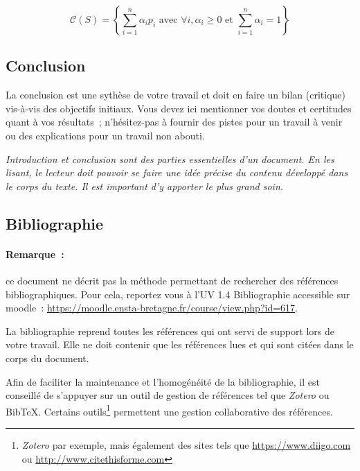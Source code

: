 \begin{equation}
  \label{eq:1}
  \mathcal C(S)=
  \left\{
    \sum_{i=1}^n\alpha_i p_i \mbox{ avec } \forall i, \alpha_i\geqslant 0
    \mbox{ et } \sum_{i=1}^n\alpha_i =  1
  \right\}
\end{equation}

\subsection{Conclusion}

La conclusion est une sythèse de votre travail et doit en faire un bilan
(critique) vis-à-vis des 
objectifs initiaux. 
Vous devez ici mentionner vos doutes et certitudes quant à
vos résultats~; n'hésitez-pas à fournir des pistes pour un travail à venir ou
des explications pour un travail non abouti.


\emph{Introduction et conclusion sont des parties essentielles d'un
  document. En les lisant, le lecteur doit pouvoir se faire une idée
  précise du contenu développé dans le corps du texte. Il est
  important d'y apporter le plus grand soin.}

\subsection{Bibliographie}

\paragraph{Remarque~:} ce document ne décrit pas la méthode
permettant de rechercher des références bibliographiques. Pour cela,
reportez vous à l'UV 1.4 \og{}Bibliographie\fg{} accessible sur moodle~:
\url{https://moodle.ensta-bretagne.fr/course/view.php?id=617}.

La bibliographie reprend toutes les références qui ont servi de support lors de
votre travail. Elle ne doit contenir que les références lues et qui sont
citées dans le corps du document.

Afin de faciliter la maintenance et l'homogénéité de la bibliographie, il est
conseillé de s'appuyer sur un outil de gestion de références tel que
\emph{Zotero} ou BibTeX. Certains outils\footnote{\emph{Zotero} par exemple,
  mais également des sites tels que \url{https://www.diigo.com} ou
  \url{http://www.citethisforme.com}}
permettent une gestion collaborative des références.

